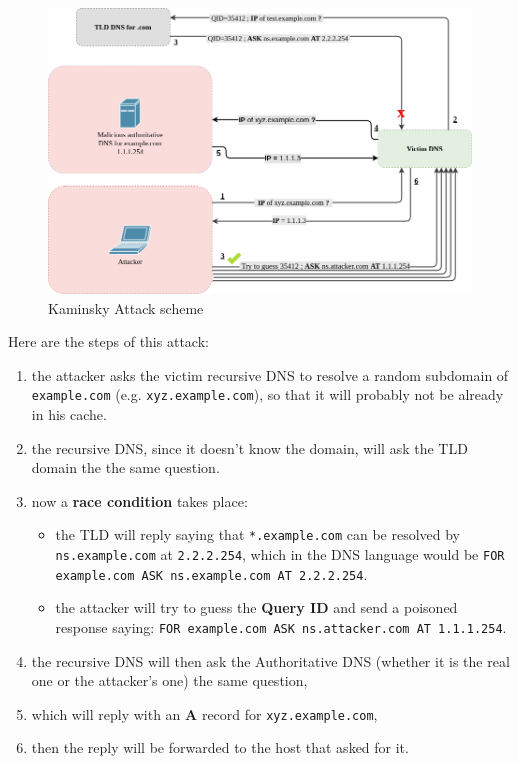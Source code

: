 \documentclass[11pt,a4paper]{article}
\begin{document}
\begin{figure}[h!]
  \includegraphics[width=\textwidth]{kaminsky-attack.png}
  \caption{Kaminsky Attack scheme}
  \label{fig:kaminsky-attack}
\end{figure}

\noindent
Here are the steps of this attack:
\begin{enumerate}
  \item the attacker asks the victim recursive DNS to resolve a random subdomain of
        \texttt{example.com} (e.g. \texttt{xyz.example.com}), so that it will probably
        not be already in his cache.
  \item the recursive DNS, since it doesn't know the domain, will ask the TLD domain the
        the same question.
  \item now a \textbf{race condition} takes place:
        \begin{itemize}
          \item the TLD will reply saying that \texttt{*.example.com} can be resolved
                by \texttt{ns.example.com} at \texttt{2.2.2.254}, which in the DNS language
                would be \texttt{FOR example.com ASK ns.example.com AT 2.2.2.254}.
          \item the attacker will try to guess the \textbf{Query ID} and send a poisoned response
                saying: \texttt{FOR example.com ASK ns.attacker.com AT 1.1.1.254}.
        \end{itemize}
  \item the recursive DNS will then ask the Authoritative DNS (whether it is the real
        one or the attacker's one) the same question,
  \item which will reply with an \textbf{A} record for \texttt{xyz.example.com},
  \item then the reply will be forwarded to the host that asked for it.
\end{enumerate}
\end{document}
